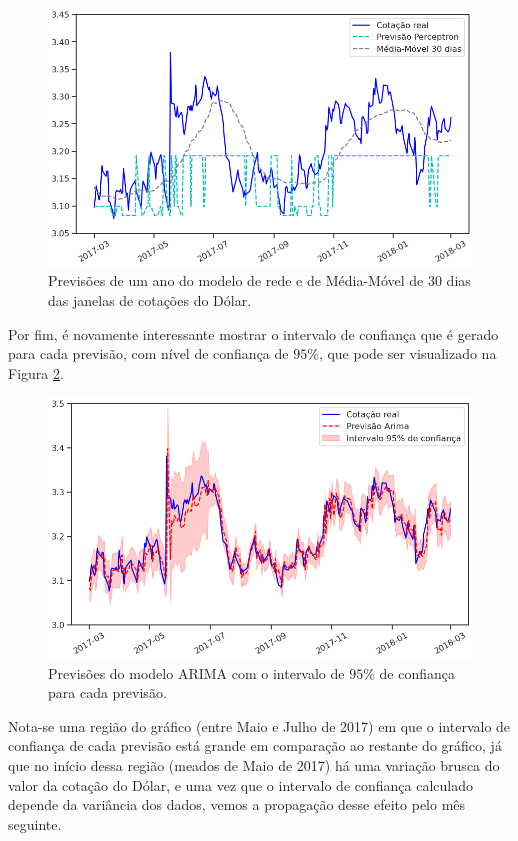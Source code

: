 \begin{figure}[htb]
\centering
\includegraphics[width=13.1cm]{figuras/series_previsoes_ano_2}
\caption{Previsões de um ano do modelo de rede  e de Média-Móvel de $30$ dias das janelas de cotações do Dólar.}
\label{fig:previsoes_ano_2}
\end{figure}

Por fim, é novamente interessante mostrar o intervalo de confiança que é gerado para cada previsão, com nível de confiança de $95\%$, que pode ser visualizado na Figura \ref{fig:series_arima_ano}.

\begin{figure}[htb]
\centering
\includegraphics[width=13.1cm]{figuras/series_arima_ano}
\caption{Previsões do modelo ARIMA com o intervalo de $95\%$ de confiança para cada previsão.}
\label{fig:series_arima_ano}
\end{figure}

Nota-se uma região do gráfico (entre Maio e Julho de 2017) em que o intervalo de confiança de cada previsão está grande em comparação ao restante do gráfico, já que no início dessa região (meados de Maio de 2017) há uma variação brusca do valor da cotação do Dólar, e uma vez que o intervalo de confiança calculado depende da variância dos dados, vemos a propagação desse efeito pelo mês seguinte.

